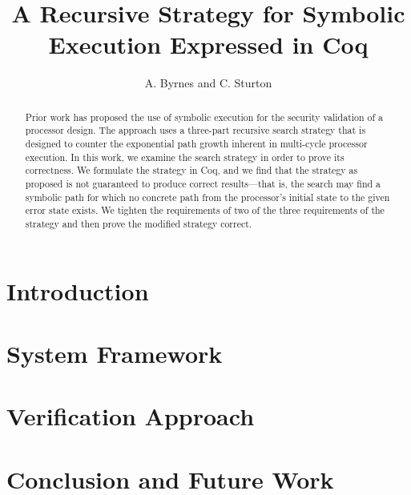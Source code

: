 \documentclass[a4paper]{article}
\title{A Recursive Strategy for Symbolic Execution Expressed in Coq}
\author{A. Byrnes and C. Sturton}
\begin{document}
\maketitle

\begin{abstract}
Prior work has proposed the use of symbolic execution for the security
validation of a processor design. The approach uses a three-part recursive search strategy
that is designed to counter the exponential path growth inherent in multi-cycle
processor execution. In this work, we examine the search strategy in order to prove its correctness. We formulate the
strategy in Coq, and we find that the
strategy as proposed is not guaranteed to produce correct results---that is, the
search may find a symbolic path for which no concrete path from the processor's initial state
to the given error state exists. We tighten the requirements of two of the three
requirements of the strategy and then prove the modified strategy correct. 
\end{abstract}

\section{Introduction}

\section{System Framework}
\section{Verification Approach}
\section{Conclusion and Future Work}






\end{document}
